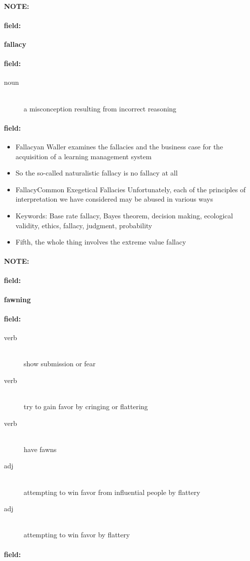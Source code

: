 \documentclass[12pt]{article}
\newenvironment{note}{\paragraph{NOTE:}}{}
\newenvironment{field}{\paragraph{field:}}{}
\begin{document}
\begin{note}
\begin{field}
\textbf{\large fallacy}
\end{field}


\begin{field}
\begin{description}
\item[noun] \hfill \\ 
a misconception resulting from incorrect reasoning

\end{description}
\end{field}

\begin{field}
\begin{itemize}
\item Fallacyan Waller examines the fallacies and the business case for the acquisition of a learning management system
\item So the so-called naturalistic fallacy is no fallacy at all
\item FallacyCommon Exegetical Fallacies Unfortunately, each of the principles of interpretation we have considered may be abused in various ways
\item Keywords: Base rate fallacy, Bayes theorem, decision making, ecological validity, ethics, fallacy, judgment, probability
\item Fifth, the whole thing involves the extreme value fallacy
\end{itemize}
\end{field}
\end{note}
\begin{note}
\begin{field}
\textbf{\large fawning}
\end{field}


\begin{field}
\begin{description}
\item[verb] \hfill \\ 
show submission or fear

\item[verb] \hfill \\ 
try to gain favor by cringing or flattering

\item[verb] \hfill \\ 
have fawns

\item[adj] \hfill \\ 
attempting to win favor from influential people by flattery

\item[adj] \hfill \\ 
attempting to win favor by flattery

\end{description}
\end{field}

\begin{field}
\end{field}
\end{note}
\end{document}
